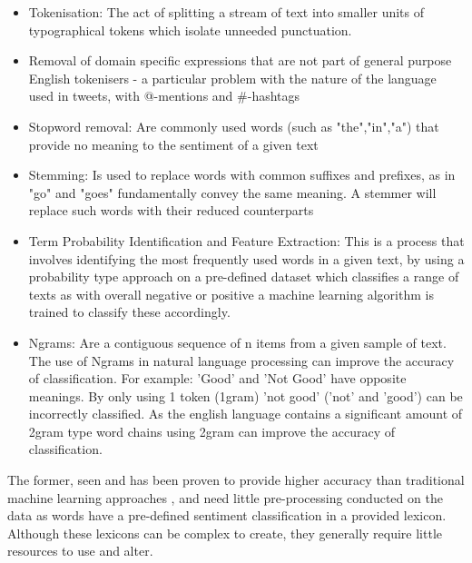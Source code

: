 \documentclass[oneside, 12pt]{article}
\begin{document}
			\begin{itemize}
				\item Tokenisation: The act of splitting a stream of text into smaller units of typographical tokens which isolate unneeded punctuation.
				\item Removal of domain specific expressions that are not part of general purpose English tokenisers - a particular problem with the nature of the language used in tweets, with @-mentions and \#-hashtags
				\item Stopword removal: Are commonly used words (such as "the","in","a") that provide no meaning to the sentiment of a given text
				\item Stemming: Is used to replace words with common suffixes and prefixes, as in "go" and "goes" fundamentally convey the same meaning. A stemmer will replace such words with their reduced counterparts
				\item Term Probability Identification and Feature Extraction: This is a process that involves identifying the most frequently used words in a given text, by using a probability type approach on a pre-defined dataset which classifies a range of texts as with overall negative or positive a machine learning algorithm is trained to classify these accordingly.
				\item Ngrams: Are a contiguous sequence of n items from a given sample of text. The use of Ngrams in natural language processing can improve the accuracy of classification. For example: 'Good' and 'Not Good' have opposite meanings. By only using 1 token (1gram) 'not good' ('not' and 'good') can be incorrectly classified. As the english language contains a significant amount of 2gram type word chains using 2gram can improve the accuracy of classification.
			\end{itemize}
			
			The former, seen and has been proven to provide higher accuracy than traditional machine learning approaches \cite{LexiconSocSent}, and need little pre-processing conducted on the data as words have a pre-defined sentiment classification in a provided lexicon. Although these lexicons can be complex to create, they generally require little resources to use and alter.
			
\end{document}

